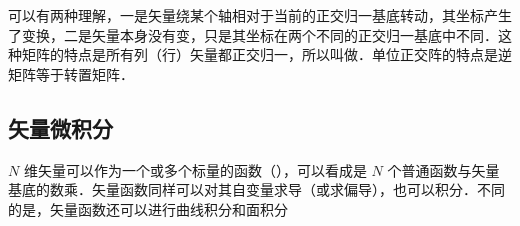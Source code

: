 可以有两种理解，一是矢量绕某个轴相对于当前的正交归一基底转动，其坐标产生了变换，二是矢量本身没有变，只是其坐标在两个不同的正交归一基底中不同．这种矩阵的特点是所有列（行）矢量都正交归一，所以叫做．单位正交阵的特点是逆矩阵等于转置矩阵．


\subsection{矢量微积分}
$N$ 维矢量可以作为一个或多个标量的函数（），可以看成是 $N$ 个普通函数与矢量基底的数乘．矢量函数同样可以对其自变量求导（或求偏导），也可以积分．不同的是，矢量函数还可以进行曲线积分和面积分 %




